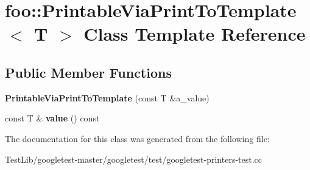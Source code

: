 \hypertarget{classfoo_1_1PrintableViaPrintToTemplate}{}\section{foo\+:\+:Printable\+Via\+Print\+To\+Template$<$ T $>$ Class Template Reference}
\label{classfoo_1_1PrintableViaPrintToTemplate}
\subsection*{Public Member Functions}
\begin{DoxyCompactItemize}
\item 
\mbox{\label{classfoo_1_1PrintableViaPrintToTemplate_a8fef9e8b59c9415624230b73469b517e}} 
{\bfseries Printable\+Via\+Print\+To\+Template} (const T \&a\+\_\+value)
\item 
\mbox{\label{classfoo_1_1PrintableViaPrintToTemplate_a14e0fcac9ae264e37e6212994b2920f6}} 
const T \& {\bfseries value} () const
\end{DoxyCompactItemize}


The documentation for this class was generated from the following file\+:\begin{DoxyCompactItemize}
\item 
Test\+Lib/googletest-\/master/googletest/test/googletest-\/printers-\/test.\+cc\end{DoxyCompactItemize}
